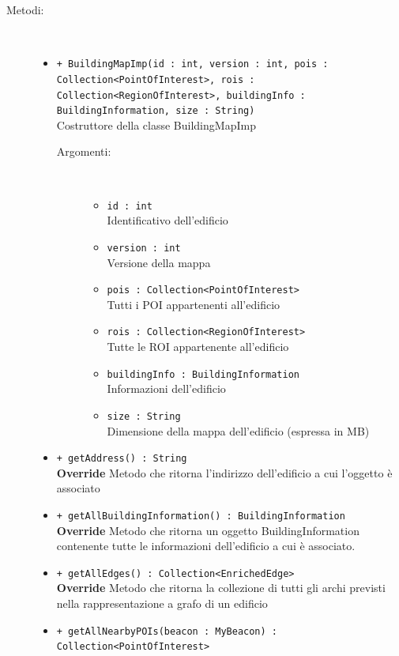 \documentclass[../DefinizioneDiProdotto.tex]{subfiles}
\begin{document}
\begin{description}
\begin{itemize}
\end{itemize}
\item[Metodi:] \
\begin{itemize}
\item \texttt{+ BuildingMapImp(id : int, version : int, pois : Collection<PointOfInterest>, rois : Collection<RegionOfInterest>, buildingInfo : BuildingInformation, size : String)}\\
Costruttore della classe BuildingMapImp
 \begin{description}
\item[Argomenti:] \
\begin{itemize}
\item \texttt{id : int}\\
Identificativo dell'edificio\item \texttt{version : int}\\
Versione della mappa\item \texttt{pois : Collection<PointOfInterest>}\\
Tutti i POI appartenenti all'edificio\item \texttt{rois : Collection<RegionOfInterest>}\\
Tutte le ROI appartenente all'edificio\item \texttt{buildingInfo : BuildingInformation}\\
Informazioni dell'edificio\item \texttt{size : String}\\
Dimensione della mappa dell'edificio (espressa in MB)\end{itemize}
\end{description}
\item \texttt{+ getAddress() : String}\\
\textbf{Override} Metodo che ritorna l'indirizzo dell'edificio a cui l'oggetto è associato
 \item \texttt{+ getAllBuildingInformation() : BuildingInformation}\\
\textbf{Override} Metodo che ritorna un oggetto BuildingInformation contenente tutte le informazioni dell'edificio a cui è associato.
 \item \texttt{+ getAllEdges() : Collection<EnrichedEdge>}\\
\textbf{Override} Metodo che ritorna la collezione di tutti gli archi previsti nella rappresentazione a grafo di un edificio
 \item \texttt{+ getAllNearbyPOIs(beacon : MyBeacon) : Collection<PointOfInterest>}\\

\end{itemize}
\end{description}
\end{document}
